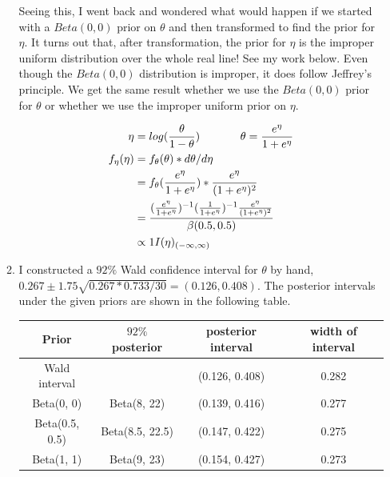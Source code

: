 \documentclass[12pt]{article}\usepackage[]{graphicx}\usepackage[]{color}
\newenvironment{knitrout}{}{} %
\begin{document}
\begin{doublespacing}
\begin{enumerate}
\begin{enumerate}
\begin{center}
\begin{knitrout}
\end{knitrout}
\end{center}

Seeing this, I went back and wondered what would happen if we started with a $Beta(0,0)$ prior on $\theta$ and then transformed to find the prior for $\eta$. It turns out that, after transformation, the prior for $\eta$ is the improper uniform distribution over the whole real line! See my work below. Even though the $Beta(0, 0)$ distribution is improper, it does follow Jeffrey's principle. We get the same result whether we use the $Beta(0, 0)$ prior for $\theta$ or whether we use the improper uniform prior on $\eta$.

\begin{align*}
\eta &= log(\frac{\theta}{1-\theta}) \hspace{.5in} \theta = \frac{e^{\eta}}{1+e^{\eta}} \\
f_{\eta}(\eta) &= f_{\theta}(\theta)*d\theta/d\eta \\
&= f_{\theta}(\frac{e^{\eta}}{1+e^{\eta}})*\frac{e^{\eta}}{(1+e^{\eta})^2} \\
&= \frac{(\frac{e^{\eta}}{1+e^{\eta}})^{-1}(\frac{1}{1+e^{\eta}})^{-1}\frac{e^{\eta}}{(1+e^{\eta})^2}}{\beta(0.5, 0.5)} \\
&\propto 1I(\eta)_{(-\infty, \infty)}
\end{align*}

\item I constructed a $92\%$ Wald confidence interval for $\theta$ by hand, $0.267 \pm 1.75\sqrt{0.267*0.733/30} = (0.126, 0.408)$. The posterior intervals under the given priors are shown in the following table.
\begin{table}[!h]
\centering
\begin{tabular}{c|c|c|c}
Prior & $92\%$ posterior & posterior interval & width of interval \\
\hline
Wald interval & & (0.126, 0.408) & 0.282 \\
Beta(0, 0) & Beta(8, 22) & (0.139, 0.416) & 0.277 \\
Beta(0.5, 0.5) & Beta(8.5, 22.5) & (0.147, 0.422) & 0.275\\
Beta(1, 1) & Beta(9, 23) & (0.154, 0.427) & 0.273\\
\hline
\end{tabular}
\end{table}


\end{enumerate}
\end{enumerate}
\end{doublespacing}
\end{document}
